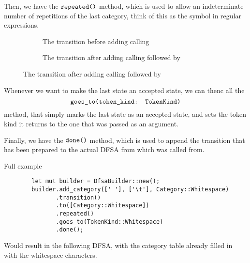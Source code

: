 Then, we have the $\texttt{repeated()}$ method, which is used to allow an
indeterminate number of repetitions of the last category, think of this as the
\code{*} symbol in regular expressions.

\begin{figure}[H]
    \begin{subfigure}[t]{0.5\textwidth}
        \centering
        \caption{The transition before adding calling }
    \end{subfigure}
    \begin{subfigure}[t]{0.5\textwidth}
        \centering
        \caption{The transition after adding calling  followed by  }
    \end{subfigure}
\end{figure}


Whenever we want to make the last state an accepted state, we can thenc all the
$$\texttt{goes\_to(token\_kind: TokenKind)}$$ method, that simply marks the last state as
an accepted state, and sets the token kind it returns to the one that was passed
as an argument.

Finally, we have the $\texttt{done()}$ method, which is used to append the transition that has been prepared to the actual DFSA from which  was called from.


\begin{mainbox}{Full example}
    \lstset{xleftmargin=1cm, aboveskip=0pt, belowskip=0pt}
    \begin{lstlisting}
        let mut builder = DfsaBuilder::new();
        builder.add_category([' '], ['\t'], Category::Whitespace)
               .transition()
               .to([Category::Whitespace])
               .repeated()
               .goes_to(TokenKind::Whitespace)
               .done();
    \end{lstlisting}
\end{mainbox}

Would result in the following DFSA, with the category table already filled in
with the whitespace characters.

